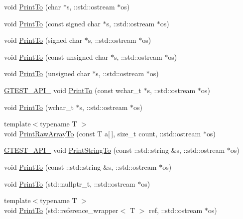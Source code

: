 \begin{DoxyCompactItemize}
\item 
void \hyperlink{namespacetesting_1_1internal_a553eec7bb50de01c9e91cac4accc606f}{Print\+To} (char $\ast$s, \+::std\+::ostream $\ast$os)
\item 
void \hyperlink{namespacetesting_1_1internal_a792cc5665a34619ed7a6d54711433456}{Print\+To} (const signed char $\ast$s, \+::std\+::ostream $\ast$os)
\item 
void \hyperlink{namespacetesting_1_1internal_a1320096b116f8cc4b688acbd5b783051}{Print\+To} (signed char $\ast$s, \+::std\+::ostream $\ast$os)
\item 
void \hyperlink{namespacetesting_1_1internal_a42c591f2164ad105b502a9262333aed2}{Print\+To} (const unsigned char $\ast$s, \+::std\+::ostream $\ast$os)
\item 
void \hyperlink{namespacetesting_1_1internal_a7fae797c500d66d0f5a9db4f205e3416}{Print\+To} (unsigned char $\ast$s, \+::std\+::ostream $\ast$os)
\item 
\hyperlink{gtest-port_8h_aa73be6f0ba4a7456180a94904ce17790}{G\+T\+E\+S\+T\+\_\+\+A\+P\+I\+\_\+} void \hyperlink{namespacetesting_1_1internal_afb038075e9e2166d1d9158a19e0eed23}{Print\+To} (const wchar\+\_\+t $\ast$s, \+::std\+::ostream $\ast$os)
\item 
void \hyperlink{namespacetesting_1_1internal_a8d41baa371fad3eb5a3dbe1bbc02c290}{Print\+To} (wchar\+\_\+t $\ast$s, \+::std\+::ostream $\ast$os)
\item 
{\footnotesize template$<$typename T $>$ }\\void \hyperlink{namespacetesting_1_1internal_ad3013b6b4c825edee9fe18ff1d982faa}{Print\+Raw\+Array\+To} (const T a\mbox{[}$\,$\mbox{]}, size\+\_\+t count, \+::std\+::ostream $\ast$os)
\item 
\hyperlink{gtest-port_8h_aa73be6f0ba4a7456180a94904ce17790}{G\+T\+E\+S\+T\+\_\+\+A\+P\+I\+\_\+} void \hyperlink{namespacetesting_1_1internal_a8b53e46cea3f8bdfc9342057c4f6ba62}{Print\+String\+To} (const \+::std\+::string \&s, \+::std\+::ostream $\ast$os)
\item 
void \hyperlink{namespacetesting_1_1internal_af59b4f5d83276cd807c45063b14bad44}{Print\+To} (const \+::std\+::string \&s, \+::std\+::ostream $\ast$os)
\item 
void \hyperlink{namespacetesting_1_1internal_a76f564cf23190dbd5c9e088defdd092b}{Print\+To} (std\+::nullptr\+\_\+t, \+::std\+::ostream $\ast$os)
\item 
{\footnotesize template$<$typename T $>$ }\\void \hyperlink{namespacetesting_1_1internal_a5587d09db034bc597870ae86bd8c01f8}{Print\+To} (std\+::reference\+\_\+wrapper$<$ T $>$ ref, \+::std\+::ostream $\ast$os)

\end{DoxyCompactItemize}
